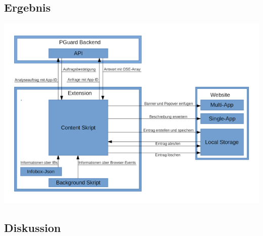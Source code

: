 \subsection{Ergebnis}
\label{ss:ergebnisseht1}

\includegraphics{pics/Aufbau.png}

\subsection{Diskussion}
\label{ss:diskussionht1}










